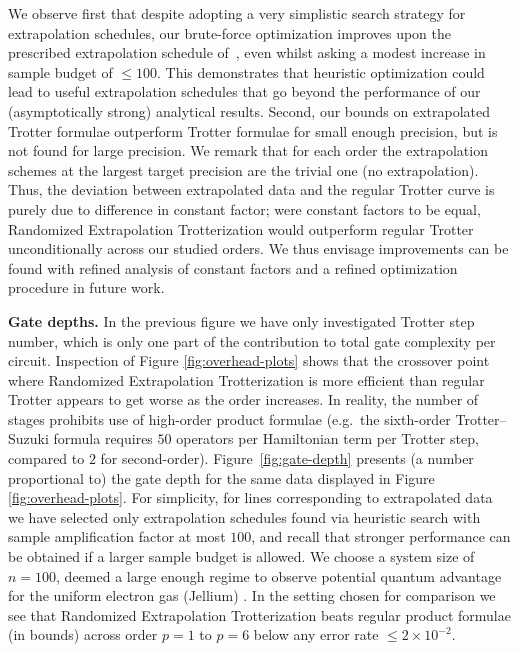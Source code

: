 We observe first that despite adopting a very simplistic search strategy for extrapolation schedules, our brute-force optimization improves upon the prescribed extrapolation schedule of~\cite{low2019Multiproduct}, even whilst asking a modest increase in sample budget of $\leq 100$. This demonstrates that heuristic optimization could lead to useful extrapolation schedules that go beyond the performance of our (asymptotically strong) analytical results. Second, our bounds on extrapolated Trotter formulae outperform Trotter formulae for small enough precision, but is not found for large precision. We remark that for each order the extrapolation schemes at the largest target precision are the trivial one (no extrapolation). Thus, the deviation between extrapolated data and the regular Trotter curve is purely due to difference in constant factor; were constant factors to be equal, Randomized Extrapolation Trotterization would outperform regular Trotter unconditionally across our studied orders. %
We thus envisage improvements can be found with refined analysis of constant factors and a refined optimization procedure in future work.

\medskip

\textbf{Gate depths.} In the previous figure we have only investigated Trotter step number, which is only one part of the contribution to total gate complexity per circuit. Inspection of Figure \ref{fig:overhead-plots} shows that the crossover point where Randomized Extrapolation Trotterization is more efficient than regular Trotter appears to get worse as the order increases. In reality, the number of stages prohibits use of high-order product formulae (e.g.~the sixth-order Trotter--Suzuki formula requires $50$ operators per Hamiltonian term per Trotter step, compared to $2$ for second-order). Figure~\ref{fig:gate-depth} presents (a number proportional to) the gate depth for the same data displayed in Figure \ref{fig:overhead-plots}. For simplicity, for lines corresponding to extrapolated data we have selected only extrapolation schedules found via heuristic search with sample amplification factor at most $100$, and recall that stronger performance can be obtained if a larger sample budget is allowed. We choose a system size of $n=100$, deemed a large enough regime to observe potential quantum advantage for the uniform electron gas (Jellium) \cite{babbush2018LowDepthQSimMaterial}. In the setting chosen for comparison we see that Randomized Extrapolation Trotterization beats regular product formulae (in bounds) across order $p=1$ to $p=6$ below any error rate $\leq 2\times 10^{-2}$.

